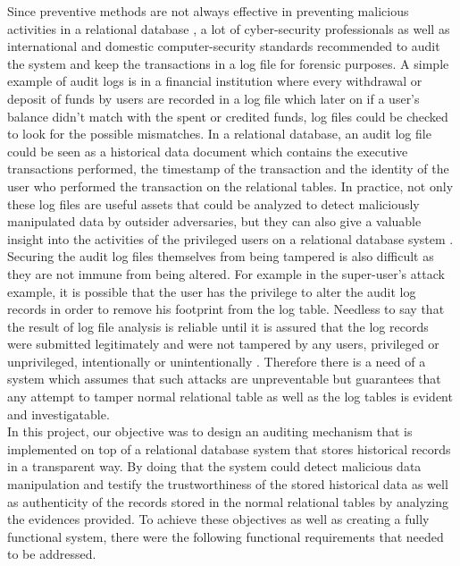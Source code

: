 Since preventive methods are not always effective in preventing malicious activities in a relational database \cite{Ammann2002recovery}, a lot of cyber-security professionals \cite{marty2011cloud}\cite{Patrascu2015logging}\cite{wagner2018detect}\cite{sinha2014continuous} as well as international and domestic computer-security standards \cite{ehealth3542}\cite{NIST2006}\cite{UBC2014} \cite{USDoD1985}recommended to audit the system and keep the transactions in a log file for forensic purposes. A simple example of audit logs is in a financial institution where every withdrawal or deposit of funds by users are recorded in a log file which later on if a user’s balance didn’t match with the spent or credited funds, log files could be checked to look for the possible mismatches. In a relational database, an audit log file could be seen as a historical data document which contains the executive transactions performed, the timestamp of the transaction and the identity of the user who performed the transaction on the relational tables. In practice, not only these log files are useful assets that could be analyzed to detect maliciously manipulated data by outsider adversaries, but they can also give a valuable insight into the activities of the privileged users on a relational database system \cite{sinha2014continuous}.\\
Securing the audit log files themselves from being tampered is also difficult as they are not immune from being altered\cite{wagner2018detect}. For example in the super-user’s attack example, it is possible that the user has the privilege to alter the audit log records in order to remove his footprint from the log table. Needless to say that the result of log file analysis is reliable until it is assured that the log records were submitted legitimately and were not tampered by any users, privileged or unprivileged, intentionally or unintentionally \cite{lin2015secure}. Therefore there is a need of a system which assumes that such attacks are unpreventable but guarantees that any attempt to tamper normal relational table as well as the log tables is evident and investigatable.\\
In this project, our objective was to design an auditing mechanism that is implemented on top of a relational database system that stores historical records in a transparent way. By doing that the system could detect malicious data manipulation and testify the trustworthiness of the stored historical data as well as authenticity of the records stored in the normal relational tables by analyzing the evidences provided. To achieve these objectives as well as creating a fully functional system, there were the following functional requirements that needed to be addressed.
